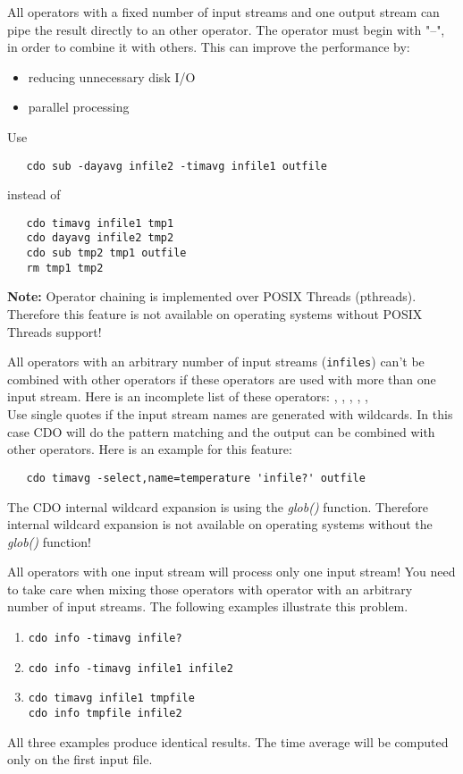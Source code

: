 All operators with a fixed number of input streams and one output stream
can pipe the result directly to an other operator.
The operator must begin with "--", in order to combine it with others.
This can improve the performance by:
\begin{itemize}
\item reducing unnecessary disk I/O
\item parallel processing
\end{itemize}
Use
\begin{verbatim}
   cdo sub -dayavg infile2 -timavg infile1 outfile
\end{verbatim}
instead of
\begin{verbatim}
   cdo timavg infile1 tmp1
   cdo dayavg infile2 tmp2
   cdo sub tmp2 tmp1 outfile
   rm tmp1 tmp2
\end{verbatim}

\textbf{Note:}
Operator chaining is implemented over POSIX Threads (pthreads).
Therefore this {\CDO} feature is not available on operating systems without POSIX Threads support!

All operators with an arbitrary number of input streams (\texttt{infiles})
can't be combined with other operators if these operators are used
with more than one input stream. Here is an incomplete list of
these operators:
\textbf{},
\textbf{},
\textbf{},
\textbf{},
\textbf{},
\textbf{} \\
Use single quotes if the input stream names are generated with
wildcards. In this case CDO will do the pattern matching and the
output can be combined with other operators. Here is an example for
this feature:
\begin{verbatim}
   cdo timavg -select,name=temperature 'infile?' outfile
\end{verbatim}

The CDO internal wildcard expansion is using the \textit{glob()} function. 
Therefore internal wildcard expansion is not available on operating systems without the \textit{glob()} function!

All operators with one input stream will process only one input
stream! You need to take care when mixing those operators with
operator with an arbitrary number of input streams. 
The following examples illustrate this problem.
\begin{enumerate}
\item \texttt{cdo info -timavg infile?}
\item \texttt{cdo info -timavg infile1 infile2}
\item \texttt{cdo timavg infile1 tmpfile} \\
\texttt{cdo info tmpfile infile2}
\end{enumerate}
 All three examples produce identical results. 
The time average will be computed only on the first input file. 
